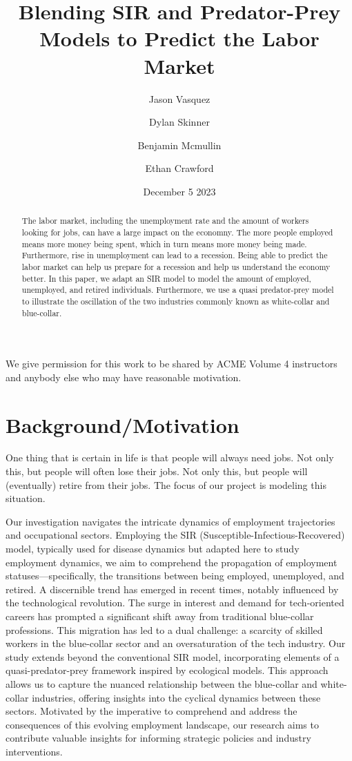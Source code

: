 \documentclass[11pt]{amsart}
\title{Blending SIR and Predator-Prey Models to Predict the Labor Market}
\author{Jason Vasquez \and Dylan Skinner \and Benjamin Mcmullin \and Ethan Crawford}
\date{December 5 2023}
\begin{document}
\begin{abstract}

    The labor market, including the unemployment rate and the amount of workers looking for jobs, can have a large impact on the economny.
    The more people employed means more money being spent, which in turn means more money being made. 
    Furthermore, rise in unemployment can lead to a recession. Being able to predict the labor market can help us prepare for a recession and help us understand the economy better.
    In this paper, we adapt an SIR model to model the amount of employed, unemployed, and retired individuals.
    Furthermore, we use a quasi predator-prey model to illustrate the oscillation of the two industries commonly known as white-collar and blue-collar.
    
\end{abstract}

\maketitle

We give permission for this work to be shared by ACME Volume 4 instructors and anybody else who may have reasonable motivation.

\section{Background/Motivation}

One thing that is certain in life is that people will always need jobs. Not only this, but people 
will often lose their jobs. Not only this, but people will (eventually) retire from their jobs.
The focus of our project is modeling this situation.

Our investigation navigates the intricate dynamics of employment trajectories and occupational sectors. 
Employing the SIR (Susceptible-Infectious-Recovered) model, typically used for disease dynamics but adapted 
here to study employment dynamics, we aim to comprehend the propagation of employment statuses—specifically, 
the transitions between being employed, unemployed, and retired. A discernible trend has emerged in recent times, 
notably influenced by the technological revolution. The surge in interest and demand for tech-oriented careers 
has prompted a significant shift away from traditional blue-collar professions. This migration has led to a 
dual challenge: a scarcity of skilled workers in the blue-collar sector and an oversaturation of the tech 
industry. Our study extends beyond the conventional SIR model, incorporating elements of a quasi-predator-prey 
framework inspired by ecological models. This approach allows us to capture the nuanced relationship between 
the blue-collar and white-collar industries, offering insights into the cyclical dynamics between these sectors. 
Motivated by the imperative to comprehend and address the consequences of this evolving employment landscape, 
our research aims to contribute valuable insights for informing strategic policies and industry interventions.
\end{document}

